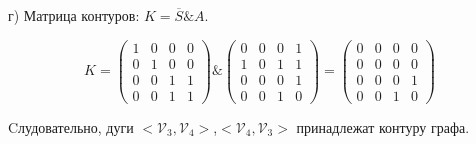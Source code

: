 г) Матрица контуров: $K = \overline{S}\&A$.

$$K = \begin{pmatrix}1 & 0 & 0 & 0 \\0 & 1 & 0 & 0\\0 & 0 & 1 & 1\\0 & 0 & 1 & 1\end{pmatrix}\&\begin{pmatrix}0 & 0 & 0 & 1 \\1 & 0 & 1 & 1\\0 & 0 & 0 & 1\\0 & 0 & 1 & 0\end{pmatrix} = \begin{pmatrix}0 & 0 & 0 & 0 \\0 & 0 & 0 & 0\\0 & 0 & 0 & 1\\0 & 0 & 1 & 0\end{pmatrix}$$

Cлудовательно, дуги $<\mathcal{V}_3,\mathcal{V}_4>$,$<\mathcal{V}_4,\mathcal{V}_3>$ принадлежат контуру графа.

\newpage